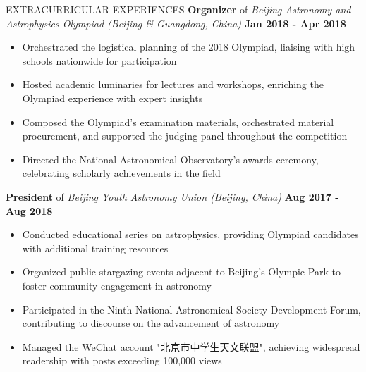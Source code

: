 \documentclass[10pt]{article} %
\begin{document}
\begin{section}{EXTRACURRICULAR EXPERIENCES}
\textbf{Organizer} of \textit{Beijing Astronomy and Astrophysics Olympiad (Beijing \& Guangdong, China)} \hfill \textbf{Jan 2018 - Apr 2018} 
\begin{itemize}[leftmargin=1.5em]
    \item Orchestrated the logistical planning of the 2018 Olympiad, liaising with high schools nationwide for participation
    \item Hosted academic luminaries for lectures and workshops, enriching the Olympiad experience with expert insights
    \item Composed the Olympiad's examination materials, orchestrated material procurement, and supported the judging panel throughout the competition
    \item Directed the National Astronomical Observatory's awards ceremony, celebrating scholarly achievements in the field
\end{itemize}

\textbf{President} of \textit{Beijing Youth Astronomy Union (Beijing, China)} \hfill \textbf{Aug 2017 - Aug 2018} 
\begin{itemize}[leftmargin=1.5em]
    \item Conducted educational series on astrophysics, providing Olympiad candidates with additional training resources
    \item Organized public stargazing events adjacent to Beijing's Olympic Park to foster community engagement in astronomy
    \item Participated in the Ninth National Astronomical Society Development Forum, contributing to discourse on the advancement of astronomy
    \item Managed the WeChat account "北京市中学生天文联盟", achieving widespread readership with posts exceeding 100,000 views
\end{itemize}

\end{section}
\end{document}
